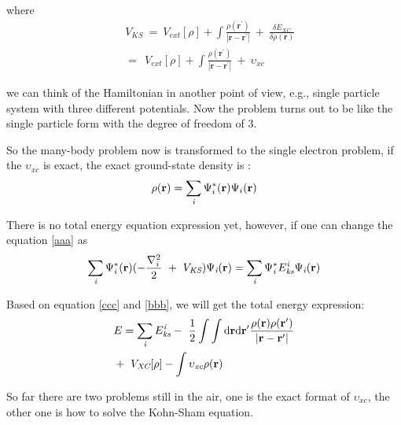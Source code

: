 \documentclass[a4paper, 12pt, titlepage,oneside,drop]{kthesis}
\begin{document}
\noindent where
\begin{equation}\begin{split}
&\ V_\textit{KS} \ = \ V_\textit{ext}[\rho] + \int \frac{\rho(\textbf{r}^{\prime})}{|{\textbf{r}}-{\textbf{r}}^{\prime}|} \ + \ \frac{\delta{E_\textit{XC}}}{\delta{\rho(\textbf{r})}} \\
&\ = \ \ V_\textit{ext}[\rho] + \int \frac{\rho(\textbf{r}^{\prime})}{|{\textbf{r}}-{\textbf{r}}^{\prime}|} \ + \ \upsilon_\textit{xc}
\end{split}
\end{equation}

\noindent we can think of the Hamiltonian in another point of view, e.g., single particle system with three different potentials. Now the
 problem turns out to be like the single particle form with the degree of freedom of 3.

\noindent So the many-body problem now is transformed to the single electron problem, if the $\upsilon_\textit{xc}$  is exact, the exact ground-state density is :
\begin{equation}\label{ks1}
 \rho(\textbf{r}) = \sumi<i> {\Psi^{*}_{i}(\textbf{r})} {\Psi_{i}(\textbf{r})}
\end{equation}

\noindent There is no total energy equation expression yet, however, if one can change the equation \ref{aaa} as 
\begin{equation}\label{bbb}
\sumi<i> \Psi^{*}_{\textit{i}}(\textbf{r})(-\frac{\nabla^{2}_{i}}{2}\ + \ V_\textit{KS}) \Psi_{\textit{i}}(\textbf{r}) = \sumi<i> \Psi^{*}_{\textit{i}}E_{\textit{ks}}^{\textit{i}} \Psi_{\textit{i}}(\textbf{r})
\end{equation}

\noindent Based on equation \ref{ccc} and \ref{bbb}, we will get the total energy expression:
\begin{equation}\label{totalenergy}
\begin{split}
& E= \sumi<i> E_{\textit{ks}}^{\textit{i}} - \ \frac{1}{2} \int \int \mathrm{d} {\textbf{r}} \mathrm{d}{\textbf{r}^{\prime}} \frac{\rho({\textbf{r}})\rho(\textbf{r}^{\prime})}{|{\textbf{r}}-{\textbf{r}}^{\prime}|} \\
&    + \ V_\textit{XC}[\rho] - \int   \upsilon_\textit{xc} \rho({\textbf{r}})
\end{split}
\end{equation}

\noindent So far there are two problems still in the air, one is the exact format of $\upsilon_\textit{xc}$, the other one is how to solve the Kohn-Sham equation.
\end{document}
